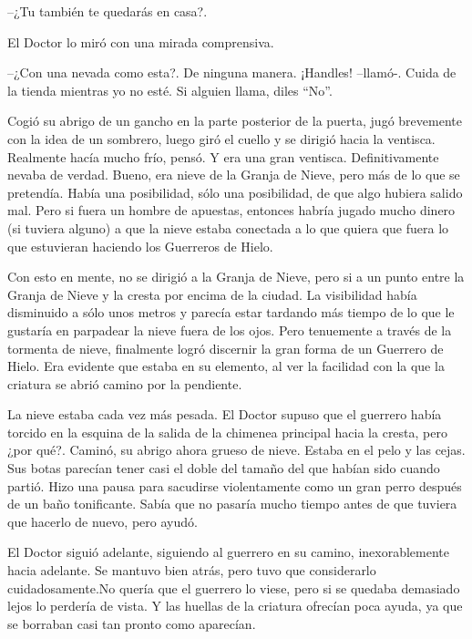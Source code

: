 --¿Tu también te quedarás en casa?.



El Doctor lo miró con una mirada comprensiva. 


--¿Con una nevada como esta?. De ninguna manera. ¡Handles! --llamó-. Cuida de la tienda mientras yo no esté. Si alguien llama, diles ``No''.



Cogió su abrigo de un gancho en la parte posterior de la puerta, jugó brevemente con la idea de un sombrero, luego giró el cuello y se dirigió hacia la ventisca. Realmente hacía mucho frío, pensó. Y era una gran ventisca. Definitivamente nevaba de verdad. Bueno, era nieve de la Granja de Nieve, pero más de lo que se pretendía. Había una posibilidad, sólo una posibilidad, de que algo hubiera salido mal. Pero si fuera un hombre de apuestas, entonces habría jugado mucho dinero (si tuviera alguno) a que la nieve estaba conectada a lo que quiera que fuera lo que estuvieran haciendo los Guerreros de Hielo.



Con esto en mente, no se dirigió a la Granja de Nieve, pero si a un punto entre la Granja de Nieve y la cresta por encima de la ciudad. La visibilidad había disminuido a sólo unos metros y parecía estar tardando más tiempo de lo que le gustaría en parpadear la nieve fuera de los ojos. Pero tenuemente a través de la tormenta de nieve, finalmente logró discernir la gran forma de un Guerrero de Hielo. Era evidente que estaba en su elemento, al ver la facilidad con la que la criatura se abrió camino por la pendiente.



La nieve estaba cada vez más pesada. El Doctor supuso que el guerrero había torcido en la esquina de la salida de la chimenea principal hacia la cresta, pero ¿por qué?. Caminó, su abrigo ahora grueso de nieve. Estaba en el pelo y las cejas. Sus botas parecían tener casi el doble del tamaño del que habían sido cuando partió. Hizo una pausa para sacudirse violentamente como un gran perro después de un baño tonificante. Sabía que no pasaría mucho tiempo antes de que tuviera que hacerlo de nuevo, pero ayudó.



El Doctor siguió adelante, siguiendo al guerrero en su camino, inexorablemente hacia adelante. Se mantuvo bien atrás, pero tuvo que considerarlo cuidadosamente.No quería que el guerrero lo viese, pero si se quedaba demasiado lejos lo perdería de vista. Y las huellas de la criatura ofrecían poca ayuda, ya que se borraban casi tan pronto como aparecían.



